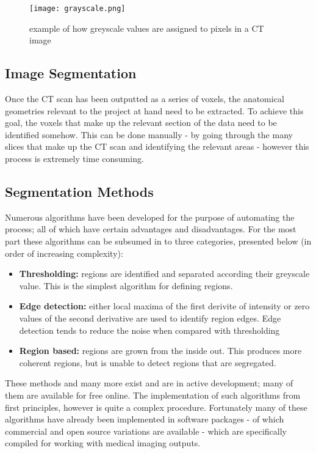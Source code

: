 \begin{figure} 
  \texttt{[image: grayscale.png]}
\caption{example of how greyscale values are assigned to pixels in a CT image} \label{fig:greyscale}
\centering
\end{figure}
 
\subsection{Image Segmentation} 

Once the CT scan has been outputted as a series of voxels, the anatomical geometries relevant to the project at hand need to be extracted. To achieve this goal, the voxels that make up the relevant section of the data need to be identified somehow. This can be done manually - by going through the many slices that make up the CT scan and identifying the relevant areas - however this process is extremely time consuming.

\subsection{Segmentation Methods}

Numerous algorithms have been developed for the purpose of automating the process; all of which have certain advantages and disadvantages. For the most part these algorithms can be subsumed in to three categories, presented below (in order of increasing complexity):

\begin{itemize}

  \item \textbf{Thresholding:} regions are identified and separated according their  greyscale value. This is the simplest algorithm for defining regions.

  \item \textbf{Edge detection:} either local maxima of the first derivite of intensity or zero values of the second derivative are used to identify region edges. Edge detection tends to reduce the noise when compared with thresholding

  \item	\textbf{Region based:} regions are grown from the inside out. This produces more coherent regions, but is unable to detect regions that are segregated.

\end{itemize}

These methods and many more exist and are in active development; many of them are available for free online. The implementation of such algorithms from first principles, however is quite a complex procedure. Fortunately many of these algorithms have already been implemented in software packages - of which commercial and open source variations are available - which are specifically compiled for working with medical imaging outputs. 
 
